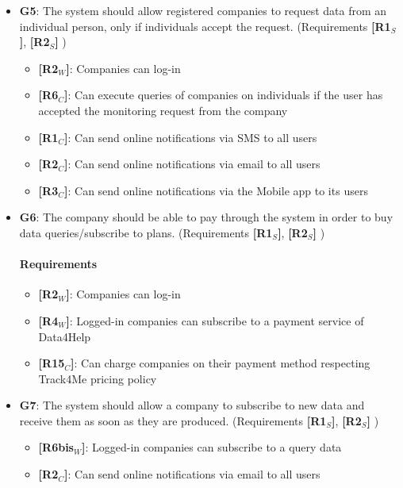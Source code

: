 \begin{itemize}
  
    \item \textbf{G5}: The system should allow registered companies to request data from an individual person, only if individuals accept the request. (Requirements \textbf{[R1$_S$]}, \textbf{[R2$_S$]} )
   \begin{itemize}
        \item \textbf{[R2$_W$]}: Companies can log-in
      \item \textbf{[R6$_C$]}: Can execute queries of companies on individuals if the user has accepted the monitoring request from the company
      \item \textbf{[R1$_C$]}: Can send online notifications via SMS to all users 
    \item \textbf{[R2$_C$]}: Can send online notifications via email to all users
    \item \textbf{[R3$_C$]}: Can send online notifications via the Mobile app to its users
   \end{itemize}
    
    
    \item \textbf{G6}: The company should be able to pay through the system in order to buy data queries/subscribe to plans. (Requirements \textbf{[R1$_S$]}, \textbf{[R2$_S$]} )
    
    \paragraph{Requirements}
   \begin{itemize}
       \item \textbf{[R2$_W$]}: Companies can log-in
       \item \textbf{[R4$_W$]}: Logged-in companies can subscribe to a payment service of Data4Help
       \item \textbf{[R15$_C$]}: Can charge companies on their payment method respecting Track4Me pricing policy
   \end{itemize}
   
   
   
    \item \textbf{G7}: The system should allow a company to subscribe to new data and receive them as soon as they are produced. (Requirements \textbf{[R1$_S$]}, \textbf{[R2$_S$]} )
    
    
   \begin{itemize}
       \item \textbf{[R6bis$_W$]}: Logged-in companies can subscribe to a query data
       \item \textbf{[R2$_C$]}: Can send online notifications via email to all users
   \end{itemize}
   

\end{itemize}
